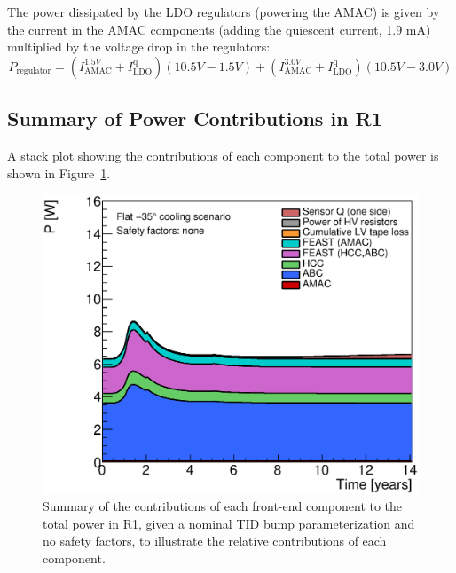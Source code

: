 The power dissipated by the LDO regulators (powering the AMAC) is given by the current in the AMAC components
(adding the quiescent current, 1.9 mA) multiplied by the voltage drop in the regulators:
\begin{equation}
P_\text{regulator} = (I^{1.5V}_\text{AMAC} + I^\text{q}_\text{LDO})\left(  10.5V - 1.5V \right)
                   + (I^{3.0V}_\text{AMAC} + I^\text{q}_\text{LDO})\left(  10.5V - 3.0V \right)
\label{eq:amac_regulator}
\end{equation}

\subsection{Summary of Power Contributions in R1}

A stack plot showing the contributions of each component to the total power is shown in
Figure~\ref{power_stackplot}.

\begin{figure}[ht!]
\begin{center}
\includegraphics[width=0.59\linewidth]{figures/PowerStackPlot.eps}
\end{center}
\caption{Summary of the contributions of each front-end component to the total power in R1, given
a nominal TID bump parameterization and no safety factors, to illustrate the relative contributions
of each component.}
\label{power_stackplot}
\end{figure}

